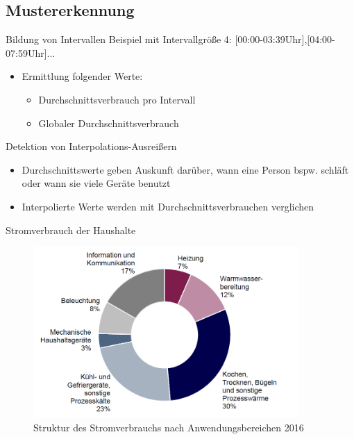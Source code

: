 \subsection{Mustererkennung}
\begin{frame}{\insertsubsectionhead}
\begin{block}{Bildung von Intervallen}
\smallskip
\small{Beispiel mit Intervallgröße 4: [00:00-03:39Uhr],[04:00-07:59Uhr]...}\normalsize
\smallskip
\begin{itemize}
\item Ermittlung folgender Werte:
\begin{itemize}
\item Durchschnittsverbrauch pro Intervall
\item Globaler Durchschnittsverbrauch
\end{itemize}
\end{itemize}
\end{block}
\begin{block}{Detektion von Interpolations-Ausreißern}
\begin{itemize}
\item Durchschnittswerte geben Auskunft darüber, wann eine Person bspw. schläft oder wann sie viele Geräte benutzt
\item Interpolierte Werte werden mit Durchschnittsverbrauchen verglichen
\end{itemize}
\end{block}

\end{frame}


\begin{frame}{Stromverbrauch der Haushalte}
\begin{figure}
  \centering
     \includegraphics[width=0.9\textwidth]{pics/avgEnergyConsumption.png}
  	\caption{Struktur des Stromverbrauchs nach Anwendungsbereichen 2016 \cite{bdew:consumption}}
  \label{fig:Bild1}
\end{figure}
\end{frame}

